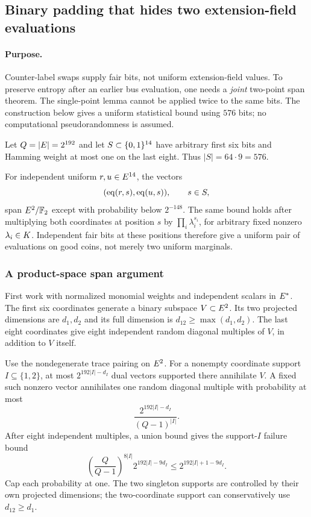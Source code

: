 \subsection{Binary padding that hides two extension-field evaluations}\label{note:zk-two-point-span}

\paragraph{Purpose.} Counter-label swaps supply fair bits, not uniform extension-field values. To preserve entropy after an earlier bus evaluation, one needs a \emph{joint} two-point span theorem. The single-point lemma cannot be applied twice to the same bits. The construction below gives a uniform statistical bound using $576$ bits; no computational pseudorandomness is assumed.

Let $Q=|E|=2^{192}$ and let $S\subset\{0,1\}^{14}$ have arbitrary first six bits and Hamming weight at most one on the last eight. Thus $|S|=64\cdot9=576$.

\begin{theorem}\label{thm:two-point-span}
For independent uniform $r,u\in E^{14}$, the vectors
\[
 (\operatorname{eq}(r,s),\operatorname{eq}(u,s)),\qquad s\in S,
\]
span $E^2/\mathbb F_2$ except with probability below $2^{-148}$. The same bound holds after multiplying both coordinates at position $s$ by $\prod_i\lambda_i^{s_i}$, for arbitrary fixed nonzero $\lambda_i\in K$. Independent fair bits at these positions therefore give a uniform pair of evaluations on good coins, not merely two uniform marginals.
\end{theorem}

\subsubsection{A product-space span argument}

First work with normalized monomial weights and independent scalars in $E^*$. The first six coordinates generate a binary subspace $V\subset E^2$. Its two projected dimensions are $d_1,d_2$ and its full dimension is $d_{12}\ge\max(d_1,d_2)$. The last eight coordinates give eight independent random diagonal multiples of $V$, in addition to $V$ itself.

Use the nondegenerate trace pairing on $E^2$. For a nonempty coordinate support $I\subseteq\{1,2\}$, at most $2^{192|I|-d_I}$ dual vectors supported there annihilate $V$. A fixed such nonzero vector annihilates one random diagonal multiple with probability at most
\[
 \frac{2^{192|I|-d_I}}{(Q-1)^{|I|}}.
\]
After eight independent multiples, a union bound gives the support-$I$ failure bound
\[
 \left(\frac Q{Q-1}\right)^{8|I|}2^{192|I|-9d_I}
 \le 2^{192|I|+1-9d_I}.
\]
Cap each probability at one. The two singleton supports are controlled by their own projected dimensions; the two-coordinate support can conservatively use $d_{12}\ge d_1$.

